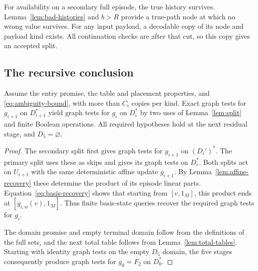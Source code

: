 For availability on a secondary full episode, the true history survives.
Lemma~\ref{lem:bad-histories} and \(b>R\) provide a true-path node at which no
wrong value survives. For any input payload, a decodable copy of its node
and payload kind exists. All continuation checks are after that cut, so this
copy gives an accepted split.

\subsection{The recursive conclusion}

\begin{lemma}\label{lem:aligned-stage}
Assume the entry promise, the table and placement properties, and
\eqref{eq:ambiguity-bound}, with more than \(C_i\) copies per kind.
Exact graph tests for \(g_{i+1}\) on \(D_{i+1}^*\) yield graph tests for
\(g_i\) on \(D_i^*\) by two uses of Lemma~\ref{lem:split} and finite Boolean
operations. All required hypotheses hold at the next residual stage, and
\(D_5=\varnothing\).
\end{lemma}

\begin{proof}
The secondary split first gives graph tests for \(g_{i+1}\) on \((D_i')^*\).
The primary split uses these as skips and gives its graph tests on \(D_i^*\).
Both splits act on \(U_{i+1}\) with the same deterministic affine update
\(g_{i+1}\). By
Lemma~\ref{lem:affine-recovery} these determine the product of its episode
linear parts. Equation~\eqref{eq:basis-recovery} shows that starting from
\([v,1_M]\), this product ends at \([g_{i,w}(v),1_M]\).
Thus finite basis-state queries recover the required graph tests for \(g_i\).

The domain promise and empty terminal domain follow from the definitions of
the full sets, and the next total table follows from
Lemma~\ref{lem:total-tables}. Starting with identity graph tests on the empty
\(D_5\) domain, the five stages consequently produce graph tests for
\(g_0=F_2\) on \(D_0^*\).
\end{proof}

